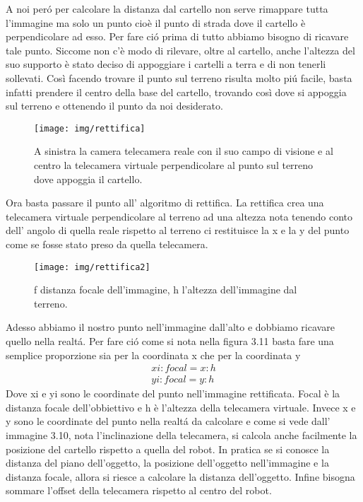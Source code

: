 		A noi per\'o per calcolare la distanza dal cartello non serve rimappare tutta l'immagine ma solo un punto cioè il punto di strada dove il cartello è perpendicolare ad esso. Per fare ci\'o prima di tutto abbiamo bisogno di ricavare tale punto. Siccome non c'è modo di rilevare, oltre al cartello, anche l'altezza del suo supporto è stato deciso di appoggiare i cartelli a terra e di non tenerli sollevati. Così facendo trovare il punto sul terreno risulta molto pi\'u facile, basta infatti prendere il centro della base del cartello, trovando così dove si appoggia sul terreno e ottenendo il punto da noi desiderato.
		\begin{figure}[!ht]
			\centering
			\texttt{[image: img/rettifica]}
			\caption[Telecamera reale e virtuale]{A sinistra la camera telecamera reale con il suo campo di visione e al centro la telecamera virtuale perpendicolare al punto sul terreno dove appoggia il cartello.}
		\end{figure}
		Ora basta passare il punto all' algoritmo di rettifica. La rettifica crea una telecamera virtuale perpendicolare al terreno ad una altezza nota tenendo conto dell' angolo di quella reale  rispetto al terreno ci restituisce la x e la y del punto come se fosse stato preso da quella telecamera.

		\begin{figure}[!ht]
			\centering
			\texttt{[image: img/rettifica2]}
			\caption[Distanza focale e distanza dal terreno]{f distanza focale dell'immagine, h l'altezza dell'immagine dal terreno.}
		\end{figure}
		Adesso abbiamo il nostro punto nell'immagine dall'alto e dobbiamo ricavare quello nella realt\'a. Per fare ci\'o come si nota nella figura 3.11 basta fare una semplice proporzione sia per la coordinata x che per la coordinata y
		\begin{align*}
			xi : focal = x : h
			\\
			yi : focal = y : h
		\end{align*}
		Dove xi e yi sono le coordinate del punto nell'immagine rettificata. Focal è la distanza focale dell'obbiettivo e h è l'altezza della telecamera virtuale. Invece x e y sono le coordinate del punto nella realt\'a da calcolare e come si vede dall' immagine 3.10, nota l'inclinazione della telecamera, si calcola anche facilmente la posizione del cartello rispetto a quella del robot.
		In pratica se si conosce la distanza del piano dell'oggetto, la posizione dell'oggetto nell'immagine e la distanza focale, allora si riesce a calcolare la distanza dell'oggetto. Infine bisogna sommare l'offset della telecamera rispetto al centro del robot.

